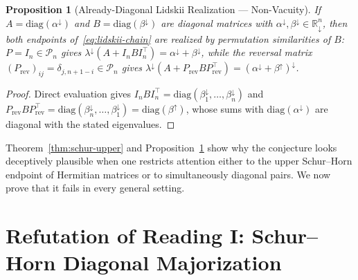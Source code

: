 \documentclass[11pt]{article}
\newtheorem{proposition}[theorem]{Proposition}
\theoremstyle{definition}
\theoremstyle{remark}
\newcommand{\R}{\mathbb{R}}
\newcommand{\Pn}{\mathcal{P}_n}
\newcommand{\diag}{\mathrm{diag}}
\begin{document}
\begin{proposition}[Already-Diagonal Lidskii Realization --- Non-Vacuity]
\label{prop:lidskii-diag}
If $A = \diag(\alpha^\downarrow)$ and $B = \diag(\beta^\downarrow)$ are diagonal
matrices with $\alpha^\downarrow, \beta^\downarrow \in \R_\downarrow^n$, then both
endpoints of~\eqref{eq:lidskii-chain} are realized by permutation similarities of
$B$: $P = I_n \in \Pn$ gives $\lambda^\downarrow(A + I_n B I_n^\top) =
\alpha^\downarrow + \beta^\downarrow$, while the reversal matrix
$(P_{\mathrm{rev}})_{ij} = \delta_{j, n+1-i} \in \Pn$ gives
$\lambda^\downarrow(A + P_{\mathrm{rev}} B P_{\mathrm{rev}}^\top) =
(\alpha^\downarrow + \beta^\uparrow)^\downarrow$.
\end{proposition}
\begin{proof}
Direct evaluation gives $I_n B I_n^\top = \diag(\beta_1^\downarrow,\dots,\beta_n^\downarrow)$
and $P_{\mathrm{rev}} B P_{\mathrm{rev}}^\top = \diag(\beta_n^\downarrow,\dots,\beta_1^\downarrow)
= \diag(\beta^\uparrow)$, whose sums with $\diag(\alpha^\downarrow)$ are diagonal
with the stated eigenvalues.
\end{proof}

Theorem~\ref{thm:schur-upper} and Proposition~\ref{prop:lidskii-diag} show why
the conjecture looks deceptively plausible when one restricts attention either to
the upper Schur--Horn endpoint of Hermitian matrices or to simultaneously diagonal
pairs. We now prove that it fails in every general setting.

\section{Refutation of Reading I: Schur--Horn Diagonal Majorization}
\label{sec:reading-i}
\end{document}
